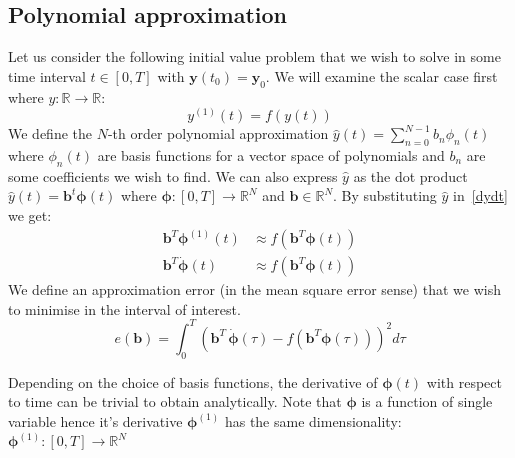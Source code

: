 \documentclass[11pt]{report}
\begin{document}
    \subsection{Polynomial approximation}
    Let us consider the following initial value problem that we wish to solve in some time interval
    $t \in [0 , T]$ with $\pmb{y} (t_0)= \pmb{y}_0$.
    We will examine the scalar case first where $y : \mathbb{R} \to \mathbb{R}$:
    \begin{equation}
        y^{(1)}(t) = f(y(t)) \label{dydt}
    \end{equation}
    We define the $N$-th order polynomial approximation  $\hat{y}(t)=\sum_{n=0}^{N-1} b_n \phi_n(t) $  where $ \phi_n(t) $ are basis functions
    for a vector space of polynomials and $b_n$ are some coefficients we wish to find.
    We can also express $\hat{y}$ as the dot product $\hat{y}(t)=  \pmb{b}^t \pmb{\phi}(t)$ where
    $\pmb{\phi} : [0,T] \to \mathbb{R}^N$ and $\pmb{b} \in \mathbb{R}^N$.
    By substituting $\hat{y}$ in~\eqref{dydt} we get:
    \begin{align}
        \pmb{b}^T \pmb{\phi}^{(1)}(t)   &\approx f( \pmb{b}^T \pmb{\phi}(t) ) \label{dPhidt}
        \\
        \pmb{b}^T \pmb{\dot{\phi}}(t)  &\approx f( \pmb{b}^T \pmb{\phi}(t)) \label{dphi_fphi}
    \end{align}
    We define an approximation error (in the mean square error sense) that we wish to minimise in the interval of interest.
    \begin{equation}
        \label{eq:error_wrt_B}
        e(\pmb{b}) = \int_0^T
        \left(
        \pmb{b}^T  \, \pmb{\dot{\phi}}(\tau) - f( \pmb{b}^T \pmb{\phi}(\tau)   )
        \right)^2
        d\tau
    \end{equation}

    Depending on the choice of basis functions, the derivative of $\pmb{\phi}(t)$ with respect to time can be trivial
    to obtain analytically.
    Note that $\pmb{\phi}$ is a function of single variable hence it's derivative $\pmb{\phi}^{(1)}$ has the same
    dimensionality: $\pmb{\phi}^{(1)} : [0,T] \to \mathbb{R}^N$
\end{document}

